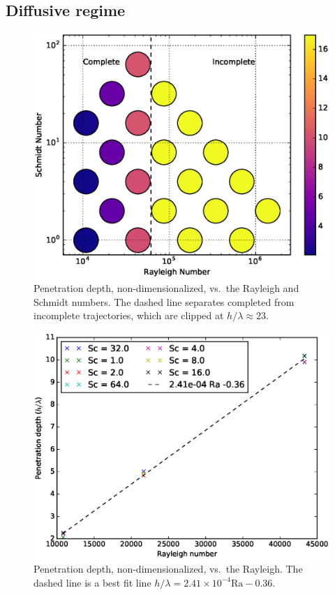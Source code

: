 \subsection{Diffusive regime}
\begin{figure}
\includegraphics[width=\columnwidth]{figs/PenetrationDepth-vs-Rayleigh-Schmidt}
\caption{ 
  Penetration depth, non-dimensionalized, vs.\ the Rayleigh and Schmidt numbers.
  The dashed line separates completed from incomplete trajectories, which are clipped at $h/\lambda \approx 23$.
}
\end{figure}

\begin{figure}
\includegraphics[width=\columnwidth]{figs/Depth-vs-Rayleigh}
\caption{ 
  Penetration depth, non-dimensionalized, vs.\ the Rayleigh.
  The dashed line is a best fit line $h/\lambda = 2.41 \times 10^{-4} \text{Ra} - 0.36$.
}
\end{figure}

